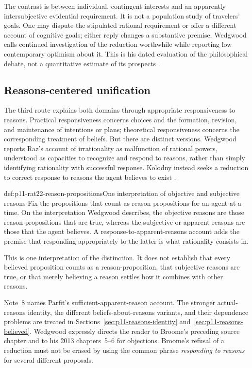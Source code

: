 The contrast is between individual, contingent interests and an
apparently intersubjective evidential requirement. It is not a population
study of travelers' goals. One may dispute the stipulated rational
requirement or offer a different account of cognitive goals; either reply
changes a substantive premise. Wedgwood calls continued investigation of
the reduction worthwhile while reporting low contemporary optimism about
it. This is his dated evaluation of the philosophical debate, not a
quantitative estimate of its prospects
\parencite[p.~141 and p.~144, nn.~6--7]{RalphWedgwood2021}.

\subsection{Reasons-centered unification}

The third route explains both domains through appropriate responsiveness
to reasons. Practical responsiveness concerns choices and the formation,
revision, and maintenance of intentions or plans; theoretical responsiveness
concerns the corresponding treatment of beliefs. But there are distinct
versions. Wedgwood reports Raz's account of irrationality as malfunction of
rational powers, understood as capacities to recognize and respond to
reasons, rather than simply identifying rationality with successful
response. Kolodny instead seeks a reduction to correct response to reasons
the agent believes to exist
\parencite[p.~142]{RalphWedgwood2021}.

\begin{hbdefinition}{def:p11-rat22-reason-propositions}{One interpretation of objective and subjective reasons}
Fix the propositions that count as reason-propositions for an agent at a
time. On the interpretation Wedgwood describes, the objective reasons are
those reason-propositions that are true, whereas the subjective or apparent
reasons are those that the agent believes. A response-to-apparent-reasons
account adds the premise that responding appropriately to the latter is
what rationality consists in.

This is one interpretation of the distinction. It does not establish that
every believed proposition counts as a reason-proposition, that subjective
reasons are true, or that merely believing a reason settles how it combines
with other reasons.
\end{hbdefinition}

Note~8 names Parfit's sufficient-apparent-reason account. The stronger
actual-reasons identity, the different beliefs-about-reasons variants,
and their dependence problems are treated in
Sections~\ref{sec:p11-reasons-identity} and~\ref{sec:p11-reasons-believed}.
Wedgwood expressly directs the reader to Broome's preceding source chapter
and to his 2013 chapters~5--6 for objections. Broome's refusal of a
reduction must not be erased by using the common phrase
\emph{responding to reasons} for several different proposals.


